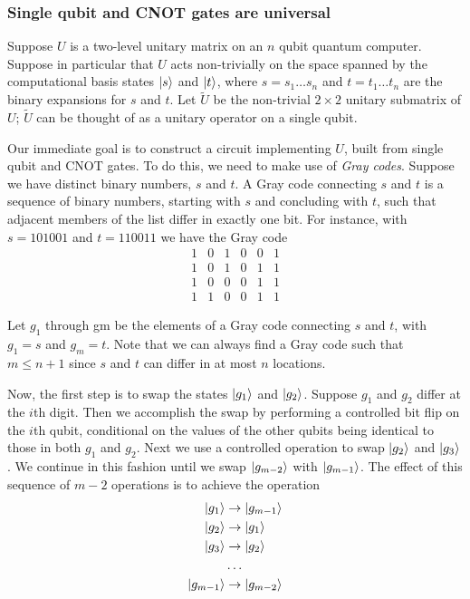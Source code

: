 \subsubsection{Single qubit and CNOT gates are universal}

Suppose $U$ is a two-level unitary matrix on an $n$ qubit quantum computer. Suppose
in particular that $U$ acts non-trivially on the space spanned by the computational basis
states $\ket{s}$ and $\ket{t}$, where $s = s_1\dots s_n$ and $t = t_1\dots t_n$ are the binary expansions for $s$ and $t$. Let $\widetilde{U}$ be the non-trivial $2\times 2$ unitary submatrix of $U$; $\widetilde{U}$ can be thought of as a unitary operator on a single qubit.
\vspace{1em}

Our immediate goal is to construct a circuit implementing $U$, built from single qubit and CNOT gates. To do this, we need to make use of \textit{Gray codes}. Suppose we have distinct binary numbers, $s$ and $t$. A Gray code connecting $s$ and $t$ is a sequence of binary numbers, starting with $s$ and concluding with $t$, such that adjacent members of the list differ in exactly one bit. For instance, with $s = 101001$ and $t = 110011$ we have the Gray code
$$\begin{matrix}1&0&1&0&0&1\\1&0&1&0&1&1\\1&0&0&0&1&1\\1&1&0&0&1&1\end{matrix}$$

Let $g_1$ through gm be the elements of a Gray code connecting $s$ and $t$, with $g_1 = s$ and $g_m = t$. Note that we can always find a Gray code such that $m \le n+1$ since $s$ and $t$ can differ in at most $n$ locations.
\vspace{1em}

Now, the first step is to swap the states $\ket{g_1}$ and $\ket{g_2}$. Suppose $g_1$ and $g_2$ differ at the $i$th digit. Then we accomplish the swap by performing a controlled bit flip on the $i$th qubit, conditional on the values of the other qubits being identical to those in both $g_1$ and $g_2$. Next we use a controlled operation to swap $\ket{g_2}$ and $\ket{g_3}$. We continue in this fashion until we swap $\ket{g_{m-2}}$ with $\ket{g_{m-1}}$. The effect of this sequence of $m − 2$ operations is to achieve the operation
\begin{equation*}
\begin{split}
    \ket{g_1} &\rightarrow \ket{g_{m-1}}\\
    \ket{g_2} &\rightarrow \ket{g_1}\\
    \ket{g_3} &\rightarrow \ket{g_2}\\
    &\dots\\
    \ket{g_{m-1}} &\rightarrow \ket{g_{m-2}}
\end{split}
\end{equation*}

